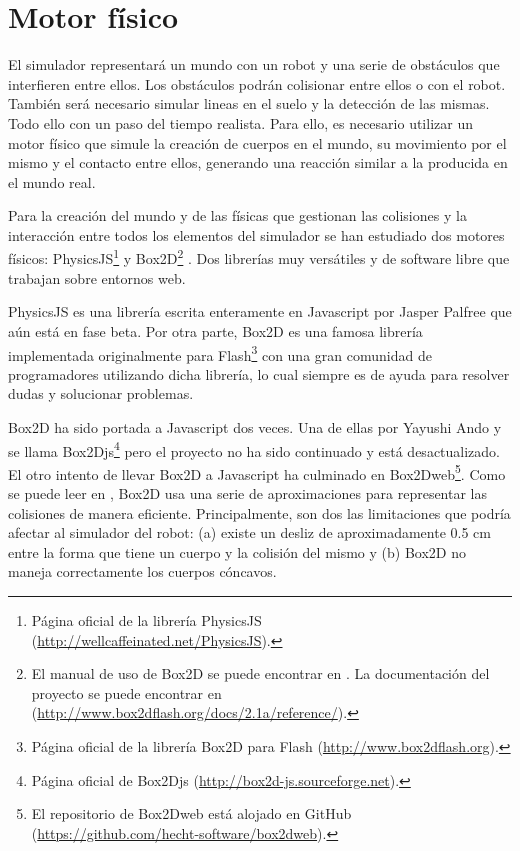 \section{Motor físico}
\label{sec:motor-fisico}

El simulador representará un mundo con un robot y una serie de obstáculos que interfieren entre ellos. Los obstáculos podrán colisionar entre ellos o con el robot. También será necesario simular lineas en el suelo y la detección de las mismas. Todo ello con un paso del tiempo realista. Para ello, es necesario utilizar un motor físico que simule la creación de cuerpos en el mundo, su movimiento por el mismo y el contacto entre ellos, generando una reacción similar a la producida en el mundo real.

Para la creación del mundo y de las físicas que gestionan las colisiones y la interacción entre todos los elementos del simulador se han estudiado dos motores físicos: PhysicsJS\footnote{Página oficial de la librería PhysicsJS (\url{http://wellcaffeinated.net/PhysicsJS}).} y Box2D\footnote{El manual de uso de Box2D se puede encontrar en \cite{box2d-manual}. La documentación del proyecto se puede encontrar en (\url{http://www.box2dflash.org/docs/2.1a/reference/}).} \cite{box2d}. Dos librerías muy versátiles y de software libre que trabajan sobre entornos web.

PhysicsJS  es una librería escrita enteramente en Javascript por Jasper Palfree que aún está en fase beta. Por otra parte, Box2D es una famosa librería implementada originalmente para Flash\footnote{Página oficial de la librería Box2D para Flash (\url{http://www.box2dflash.org}).} con una gran comunidad de programadores utilizando dicha librería, lo cual siempre es de ayuda para resolver dudas y solucionar problemas. 

Box2D ha sido portada a Javascript dos veces. Una de ellas por Yayushi Ando y se llama Box2Djs\footnote{Página oficial de Box2Djs (\url{http://box2d-js.sourceforge.net}).} pero el proyecto no ha sido continuado y está desactualizado. El otro intento de llevar Box2D a Javascript ha culminado en Box2Dweb\footnote{El repositorio de Box2Dweb está alojado en GitHub (\url{https://github.com/hecht-software/box2dweb}).}. Como se puede leer en \cite[capítulo 13]{box2d-manual}, Box2D usa una serie de aproximaciones para representar las colisiones de manera eficiente. Principalmente, son dos las limitaciones que podría afectar al simulador del robot: (a) existe un desliz de aproximadamente 0.5 cm entre la forma que tiene un cuerpo y la colisión del mismo y (b) Box2D no maneja correctamente los cuerpos cóncavos. 

